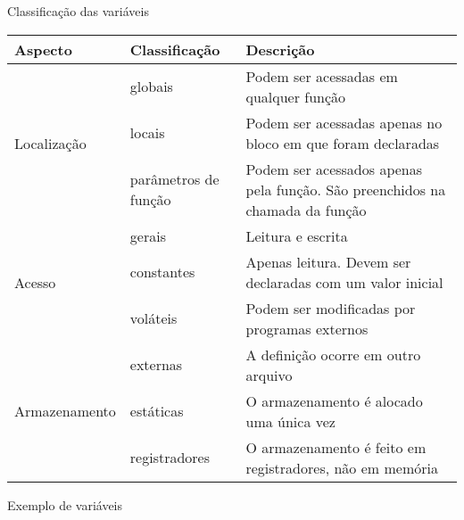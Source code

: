 \begin{frame}[fragile]{Classificação das variáveis}

	\begin{small}
    \begin{center}
        \begin{tabularx}{\textwidth}{lp{1.5cm}X}
            \toprule
            \textbf{Aspecto} & \textbf{Classificação} & \textbf{Descrição} \\
            \midrule 
            \multirow{3}{*}{\hfill Localização} & globais & Podem ser acessadas em qualquer função \\
            & \cellcolor[gray]{0.9}locais & \cellcolor[gray]{0.9}Podem ser acessadas apenas no bloco em que foram declaradas \\
            & parâmetros de função & Podem ser acessados apenas pela função. São preenchidos na 
            chamada da função \\
            \midrule 
            \multirow{3}{*}{\hfill Acesso} & \cellcolor[gray]{0.9}gerais & L\cellcolor[gray]{0.9}eitura e escrita \\
            & constantes & Apenas leitura. Devem ser declaradas com um valor inicial \\
            & \cellcolor[gray]{0.9}voláteis & \cellcolor[gray]{0.9}Podem ser modificadas por programas externos \\
            \midrule
            \multirow{3}{*}{\hfill Armazenamento} & externas & A definição ocorre em outro arquivo \\
            & \cellcolor[gray]{0.9}estáticas & \cellcolor[gray]{0.9}O armazenamento é alocado uma única vez \\
            & registradores & O armazenamento é feito em registradores, não em memória \\
            \bottomrule
        \end{tabularx}
    \end{center}
	\end{small}

\end{frame}

\begin{frame}[fragile]{Exemplo de variáveis}
\end{frame}

